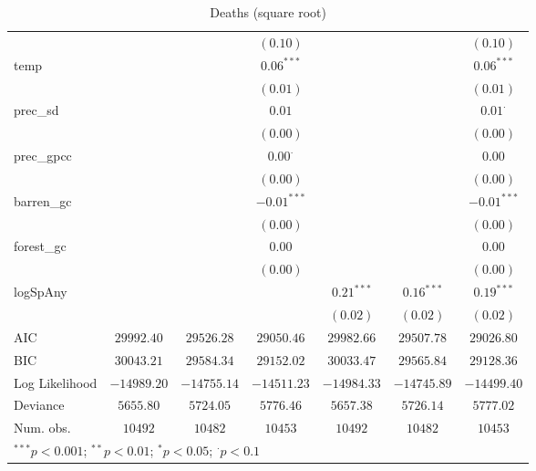 \begin{sidewaystable}
\begin{center}
{\begin{tabular}{l c c c c c c}
                &               &                & $(0.10)$       &               &               & $(0.10)$        \\
temp            &               &                & $0.06^{***}$   &               &               & $0.06^{***}$    \\
                &               &                & $(0.01)$       &               &               & $(0.01)$        \\
prec\_sd        &               &                & $0.01$         &               &               & $0.01^{\cdot}$  \\
                &               &                & $(0.00)$       &               &               & $(0.00)$        \\
prec\_gpcc      &               &                & $0.00^{\cdot}$ &               &               & $0.00$          \\
                &               &                & $(0.00)$       &               &               & $(0.00)$        \\
barren\_gc      &               &                & $-0.01^{***}$  &               &               & $-0.01^{***}$   \\
                &               &                & $(0.00)$       &               &               & $(0.00)$        \\
forest\_gc      &               &                & $0.00$         &               &               & $0.00$          \\
                &               &                & $(0.00)$       &               &               & $(0.00)$        \\
logSpAny        &               &                &                & $0.21^{***}$  & $0.16^{***}$  & $0.19^{***}$    \\
                &               &                &                & $(0.02)$      & $(0.02)$      & $(0.02)$        \\
\hline
AIC             & $29992.40$    & $29526.28$     & $29050.46$     & $29982.66$    & $29507.78$    & $29026.80$      \\
BIC             & $30043.21$    & $29584.34$     & $29152.02$     & $30033.47$    & $29565.84$    & $29128.36$      \\
Log Likelihood  & $-14989.20$   & $-14755.14$    & $-14511.23$    & $-14984.33$   & $-14745.89$   & $-14499.40$     \\
Deviance        & $5655.80$     & $5724.05$      & $5776.46$      & $5657.38$     & $5726.14$     & $5777.02$       \\
Num. obs.       & $10492$       & $10482$        & $10453$        & $10492$       & $10482$       & $10453$         \\
\hline
\multicolumn{7}{l}{\scriptsize{$^{***}p<0.001$; $^{**}p<0.01$; $^{*}p<0.05$; $^{\cdot}p<0.1$}}
\end{tabular}
}
\caption{Deaths (square root)}
\label{sqrtDeaths}
\end{center}
\end{sidewaystable}
